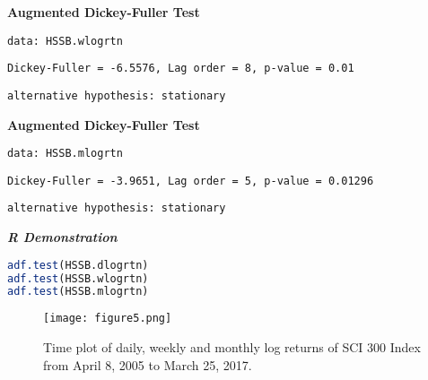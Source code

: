 \documentclass[paper=a4, fontsize=11pt]{scrartcl} %
\numberwithin{equation}{section} %
\numberwithin{figure}{section} %
\numberwithin{table}{section} %
\begin{document}
\textbf{Augmented Dickey-Fuller Test}\par
\texttt{data:  HSSB.wlogrtn}\par
\texttt{Dickey-Fuller = -6.5576, Lag order = 8, p-value = 0.01}\par
\texttt{alternative hypothesis: stationary}\par

\textbf{Augmented Dickey-Fuller Test}\par
\texttt{data:  HSSB.mlogrtn}\par
\texttt{Dickey-Fuller = -3.9651, Lag order = 5, p-value = 0.01296}\par
\texttt{alternative hypothesis: stationary}\par

\bigskip
\bigskip
\bigskip
\bigskip
\bigskip
\bigskip
\textbf{\textit{R Demonstration}}
\begin{lstlisting}[language=R]
adf.test(HSSB.dlogrtn)
adf.test(HSSB.wlogrtn)
adf.test(HSSB.mlogrtn)
\end{lstlisting}
\bigskip
\bigskip
%
%

\begin{figure}[H]
  \centering
  \texttt{[image: figure5.png]}\\
  \caption{Time plot of daily, weekly and monthly log returns of SCI 300 Index from April 8, 2005 to March 25, 2017.}
\end{figure}
\end{document}
